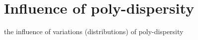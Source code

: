 
\chapter{Influence of poly-dispersity}
\label{cap:polidispersity}

the influence of variations (distributions) of poly-dispersity \\

\lipsum[1]


